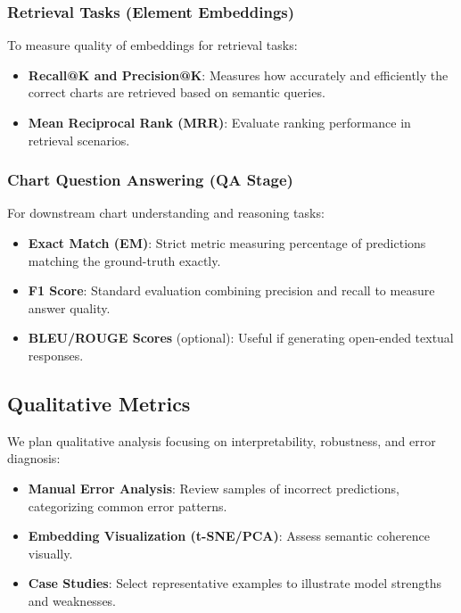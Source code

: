 \documentclass[11pt]{article}
\begin{document}
\subsubsection{Retrieval Tasks (Element Embeddings)}

To measure quality of embeddings for retrieval tasks:

\begin{itemize}
    \item \textbf{Recall@K and Precision@K}: Measures how accurately and efficiently the correct charts are retrieved based on semantic queries.
    \item \textbf{Mean Reciprocal Rank (MRR)}: Evaluate ranking performance in retrieval scenarios.
\end{itemize}

\subsubsection{Chart Question Answering (QA Stage)}

For downstream chart understanding and reasoning tasks:

\begin{itemize}
    \item \textbf{Exact Match (EM)}: Strict metric measuring percentage of predictions matching the ground-truth exactly.
    \item \textbf{F1 Score}: Standard evaluation combining precision and recall to measure answer quality.
    \item \textbf{BLEU/ROUGE Scores} (optional): Useful if generating open-ended textual responses.
\end{itemize}

\subsection{Qualitative Metrics}

We plan qualitative analysis focusing on interpretability, robustness, and error diagnosis:

\begin{itemize}
    \item \textbf{Manual Error Analysis}: Review samples of incorrect predictions, categorizing common error patterns.
    \item \textbf{Embedding Visualization (t-SNE/PCA)}: Assess semantic coherence visually.
    \item \textbf{Case Studies}: Select representative examples to illustrate model strengths and weaknesses.
\end{itemize}
\end{document}
